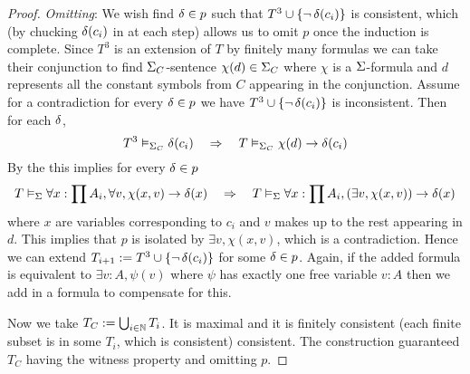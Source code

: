 \begin{proof}
    \textit{Omitting}: We wish find $\delta \in p$ such that 
    $T^3 \cup \left\{\neg\, \delta(c_i)\right\}$ is consistent, which
    (by chucking $\delta(c_i)$ in at each step) 
    allows us to omit $p$ once the induction is complete.
    Since $T^3$ is an extension of $T$ by finitely many formulas we can 
    take their conjunction to find $\Sigma_C$-sentence $\chi(d) \in \Sigma_C$ 
    where $\chi$ is a $\Sigma$-formula and $d$ represents all the constant symbols 
    from $C$ appearing in the conjunction.
    Assume for a contradiction for every $\delta \in p$ we have 
    $T^3 \cup \left\{\neg\, \delta(c_i)\right\}$ is inconsistent.
    Then for each $\delta$,
    \[
        T^3 \vDash_{\Sigma_C} \delta(c_i) \quad \Rightarrow \quad
        T \vDash_{\Sigma_C} \chi(d) \to \delta(c_i)
    \]
    By the  this implies
    for every $\delta \in p$
    \[
        T \vDash_{\Sigma} \forall x : \prod A_i, \forall v, \chi(x,v) \to \delta(x)
        \quad \Rightarrow \quad
        T \vDash_{\Sigma} \forall x : \prod A_i, (\exists v, \chi (x,v)) \to \delta(x)
    \]
    where $x$ are variables corresponding to $c_i$ and $v$ makes up to the rest
    appearing in $d$.
    This implies that $p$ is isolated by $\exists v, \chi (x,v)$,
    which is a contradiction.
    Hence we can extend $T_{i+1} := T^3 \cup \left\{\neg\, \delta(c_i)\right\}$
    for some $\delta \in p$. 
    Again, if the added formula is equivalent to $\exists v : A, \psi(v)$ 
    where $\psi$ has exactly one free variable $v : A$ then we 
    add in a formula to compensate for this.

    Now we take $T_C := \bigcup_{i \in \mathbb{N}} T_i$.
    It is maximal and it is finitely consistent 
    (each finite subset is in some $T_i$, which is consistent)
     consistent.
    The construction guaranteed $T_C$ having the witness property and 
    omitting $p$.
\end{proof}